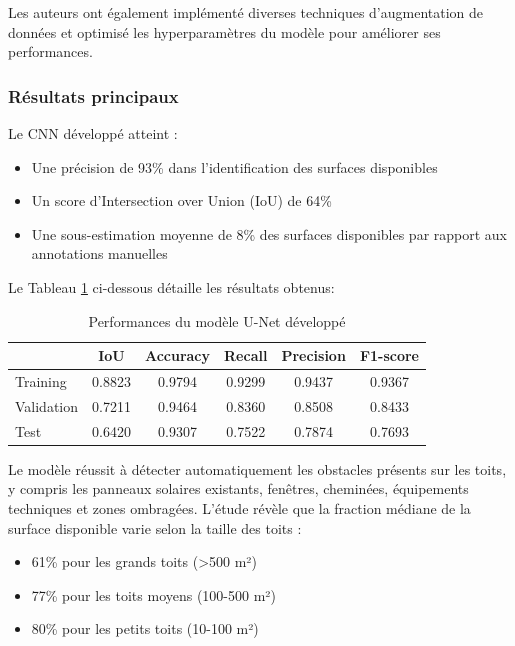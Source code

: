 \par{Les auteurs ont également implémenté diverses techniques d'augmentation de données et optimisé les hyperparamètres du modèle pour améliorer ses performances.}

\subsubsection{Résultats principaux}
Le CNN développé atteint :
\begin{itemize}
    \item Une précision de 93\% dans l'identification des surfaces disponibles
    \item Un score d'Intersection over Union (IoU) de 64\%
    \item Une sous-estimation moyenne de 8\% des surfaces disponibles par rapport aux annotations manuelles
\end{itemize}
\par{Le Tableau \ref{tab:castello_quantification_resultats} ci-dessous détaille les résultats obtenus:}
\begin{table}[H]
    \centering
    \begin{tabular}{|l|c|c|c|c|c|}
    \hline
     & IoU & Accuracy & Recall & Precision & F1-score \\
    \hline
    Training & 0.8823 & 0.9794 & 0.9299 & 0.9437 & 0.9367 \\
    Validation & 0.7211 & 0.9464 & 0.8360 & 0.8508 & 0.8433 \\
    Test & 0.6420 & 0.9307 & 0.7522 & 0.7874 & 0.7693 \\
    \hline
    \end{tabular}
    \caption{Performances du modèle U-Net développé}
\label{tab:castello_quantification_resultats}
\end{table}

\par{Le modèle réussit à détecter automatiquement les obstacles présents sur les toits, y compris les panneaux solaires existants, fenêtres, cheminées, équipements techniques et zones ombragées. L'étude révèle que la fraction médiane de la surface disponible varie selon la taille des toits :}
\begin{itemize}
    \item 61\% pour les grands toits (>500 m²)
    \item 77\% pour les toits moyens (100-500 m²)
    \item 80\% pour les petits toits (10-100 m²)
\end{itemize}

